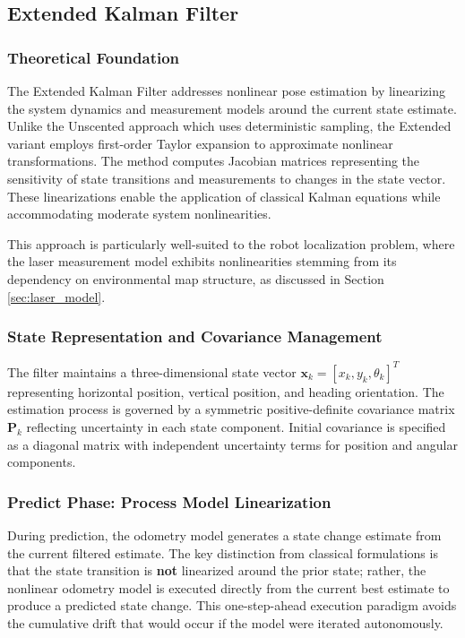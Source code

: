 \documentclass[conference]{IEEEtran}
\begin{document}
\subsection{Extended Kalman Filter} \label{sec:extended_kalman_filter}

\subsubsection{Theoretical Foundation}

The Extended Kalman Filter addresses nonlinear pose estimation by linearizing the system dynamics and measurement models around the current state estimate. Unlike the Unscented approach which uses deterministic sampling, the Extended variant employs first-order Taylor expansion to approximate nonlinear transformations. The method computes Jacobian matrices representing the sensitivity of state transitions and measurements to changes in the state vector. These linearizations enable the application of classical Kalman equations while accommodating moderate system nonlinearities.

This approach is particularly well-suited to the robot localization problem, where the laser measurement model exhibits nonlinearities stemming from its dependency on environmental map structure, as discussed in Section \ref{sec:laser_model}.

\subsubsection{State Representation and Covariance Management}

The filter maintains a three-dimensional state vector $\mathbf{x}_k = [x_k, y_k, \theta_k]^T$ representing horizontal position, vertical position, and heading orientation. The estimation process is governed by a symmetric positive-definite covariance matrix $\mathbf{P}_k$ reflecting uncertainty in each state component. Initial covariance is specified as a diagonal matrix with independent uncertainty terms for position and angular components.

\subsubsection{Predict Phase: Process Model Linearization}

During prediction, the odometry model generates a state change estimate from the current filtered estimate. The key distinction from classical formulations is that the state transition is \textbf{not} linearized around the prior state; rather, the nonlinear odometry model is executed directly from the current best estimate to produce a predicted state change. This one-step-ahead execution paradigm avoids the cumulative drift that would occur if the model were iterated autonomously.
\end{document}
